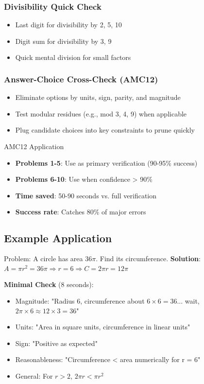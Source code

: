 \documentclass{article}
\newcommand{\problemrange}[1]{\textbf{Problems #1}}
\begin{document}
\subsubsection{Divisibility Quick Check}
\begin{itemize}
\item Last digit for divisibility by 2, 5, 10
\item Digit sum for divisibility by 3, 9
\item Quick mental division for small factors
\end{itemize}

\subsubsection{Answer-Choice Cross-Check (AMC12)}
\begin{itemize}
\item Eliminate options by units, sign, parity, and magnitude
\item Test modular residues (e.g., mod 3, 4, 9) when applicable
\item Plug candidate choices into key constraints to prune quickly
\end{itemize}

\begin{successbox}{AMC12 Application}
\begin{itemize}[nosep]
\item \problemrange{1-5}: Use as primary verification (90-95\% success)
\item \problemrange{6-10}: Use when confidence > 90\%
\item \textbf{Time saved}: 50-90 seconds vs. full verification
\item \textbf{Success rate}: Catches 80\% of major errors
\end{itemize}
\end{successbox}

\subsection{Example Application}

\begin{minimalbox}{Problem: A circle has area $36\pi$. Find its circumference.}
\textbf{Solution}: $A = \pi r^2 = 36\pi \Rightarrow r = 6 \Rightarrow C = 2\pi r = 12\pi$

\textbf{Minimal Check} (8 seconds):
\begin{itemize}[nosep]
\item Magnitude: "Radius 6, circumference about $6 \times 6 = 36$... wait, $2\pi \times 6 \approx 12 \times 3 = 36$" \checkmark
\item Units: "Area in square units, circumference in linear units" \checkmark
\item Sign: "Positive as expected" \checkmark
\item Reasonableness: "Circumference < area numerically for r = 6" \checkmark
\item General: For $r > 2$, $2\pi r < \pi r^2$
\end{itemize}
\end{minimalbox}
\end{document}
